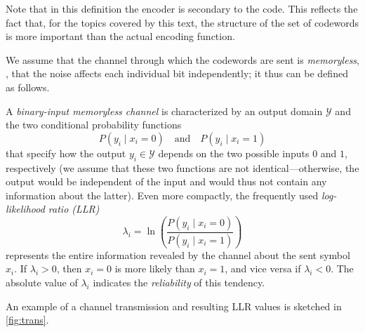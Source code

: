 Note that in this definition the encoder is secondary to the code. This reflects the fact that, for the topics covered by this text, the structure of the set of codewords is more important than the actual encoding function.

We assume that the channel through which the codewords are sent is \emph{memoryless}, \ie, that the noise affects each individual bit independently; it thus can be defined as follows.
\begin{definition}
  \label{def:intro-channel}
   A \emph{binary-input memoryless channel} is characterized by an output domain $\mathcal Y$ and the two conditional probability functions
  \begin{equation}
    P(y_i∣x_i=0) \quad\text{and}\quad P(y_i∣x_i=1)
    \label{eq:intro-channelmodel}
  \end{equation}
  that specify how the output $y_i ∈ \mathcal Y$ depends on the two possible inputs $0$ and $1$, respectively (we assume that these two functions are not identical—otherwise, the output would be independent of the input and would thus not contain any information about the latter). Even more compactly, the frequently used \emph{log-likelihood ratio (LLR)}
  \begin{equation}
   λ_i = \ln\left(\frac{P(y_i∣x_i=0)}{P(y_i∣x_i=1)}\right)
   \label{eq:intro-llr}
  \end{equation}
represents the entire information revealed by the channel about the sent symbol $x_i$. If $λ_i>0$, then $x_i=0$ is more likely than $x_i=1$, and vice versa if $λ_i<0$. The absolute value of $λ_i$ indicates the \emph{reliability} of this tendency.
\end{definition}
An example of a channel transmission and resulting LLR values is sketched in \cref{fig:trans}.
